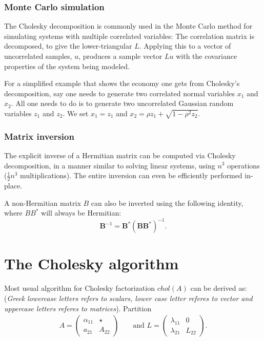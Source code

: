\subsubsection*{Monte Carlo simulation}
The Cholesky decomposition is commonly used in the Monte Carlo method for simulating systems with multiple correlated variables: The correlation matrix is decomposed, to give the lower-triangular $L$. Applying this to a vector of uncorrelated samples, $u$, produces a sample vector $Lu$ with the covariance properties of the system being modeled.

For a simplified example that shows the economy one gets from Cholesky's decomposition, say one needs to generate two correlated normal variables $x_1$ and $x_2$. All one needs to do is to generate two uncorrelated Gaussian random variables $z_1$ and $z_2$. We set $x_1=z_1$ and $x_2 = \rho z_1 + \sqrt{1-\rho ^2 z_2}$.

\subsubsection*{Matrix inversion}
The explicit inverse of a Hermitian matrix can be computed via Cholesky decomposition, in a manner similar to solving linear systems, using $\textstyle{n^3}$ operations ($\textstyle\frac{1}{2}n^3$ multiplications). The entire inversion can even be efficiently performed in-place.

A non-Hermitian matrix $B$ can also be inverted using the following identity, where $BB^*$ will always be Hermitian:
\begin{equation*}
\mathbf{B}^{-1} = \mathbf{B}^{*} \mathbf{(B B ^ {*})}^{-1}.	
\end{equation*}

\section{The Cholesky algorithm}
Most usual algorithm for Cholesky factorization $chol(A)$ can be derived as: (\textit{Greek lowercase letters refers to scalars, lower case letter referes to vector and uppercase letters referes to matrices}). Partition
\begin{equation*}
\begin{aligned}
	A=
	\left(
\begin{array}{c|c}
\alpha_{11}  & \star \\ \hline
a_{21} & A_{22}
\end{array}
\right)
& &
\text{ and }
L=
\left(
\begin{array}{c|c}
\lambda_{11}  & 0 \\ \hline
\lambda_{21} & L_{22}
\end{array}\right).	
\end{aligned}
\end{equation*}

